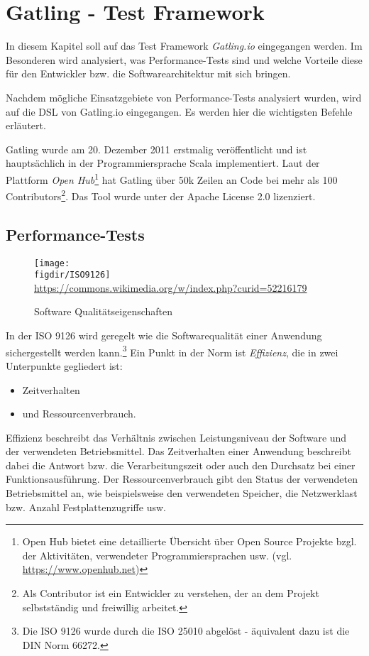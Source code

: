 \chapter{Gatling - Test Framework}

In diesem Kapitel soll auf das Test Framework \textit{Gatling.io} eingegangen werden.
Im Besonderen wird analysiert, was Performance-Tests sind und welche Vorteile diese für den Entwickler bzw. die Softwarearchitektur mit sich bringen.

Nachdem mögliche Einsatzgebiete von Performance-Tests analysiert wurden, wird auf die \ac{DSL} von Gatling.io eingegangen.
Es werden hier die wichtigsten Befehle erläutert.

Gatling wurde am 20. Dezember 2011 erstmalig veröffentlicht und ist hauptsächlich in der Programmiersprache Scala implementiert. 
Laut der Plattform \textit{Open Hub}\footnote{{}Open Hub bietet eine detaillierte Übersicht über Open Source Projekte bzgl. der Aktivitäten, verwendeter Programmiersprachen usw. (vgl. \url{https://www.openhub.net})} hat Gatling über 50k Zeilen an Code bei mehr als 100 Contributors\footnote{{} Als Contributor ist ein Entwickler zu verstehen, der an dem Projekt selbstständig und freiwillig arbeitet.}.\cite{Gatli41:online} 
Das Tool wurde unter der Apache License 2.0 lizenziert.

\section{Performance-Tests}
\begin{figure}
	{\caption{Software Qualitätseigenschaften}
		\label{fig:ISO9126}}
	{\texttt{[image: \\figdir/ISO9126]}}\\
     \tiny{\quelle\url{https://commons.wikimedia.org/w/index.php?curid=52216179}\cite{ISO9126q74:online}}
\end{figure}
In der ISO 9126 wird geregelt wie die Softwarequalität einer Anwendung sichergestellt werden kann.\footnote{{} Die ISO 9126 wurde durch die ISO 25010 abgelöst - äquivalent dazu ist die DIN Norm 66272.}\cite{ISOIEC2533:online} 
Ein Punkt in der Norm ist \textit{Effizienz}, die in zwei Unterpunkte gegliedert ist:
\begin{itemize}
\item Zeitverhalten
\item und Ressourcenverbrauch.
\end{itemize}
Effizienz beschreibt das Verhältnis zwischen Leistungsniveau der Software und der verwendeten Betriebsmittel.
Das Zeitverhalten einer Anwendung beschreibt dabei die Antwort bzw. die Verarbeitungszeit oder auch den Durchsatz bei einer Funktionsausführung. 
Der Ressourcenverbrauch gibt den Status der verwendeten Betriebsmittel an, wie beispielsweise den verwendeten Speicher, die Netzwerklast bzw. Anzahl Festplattenzugriffe usw.

